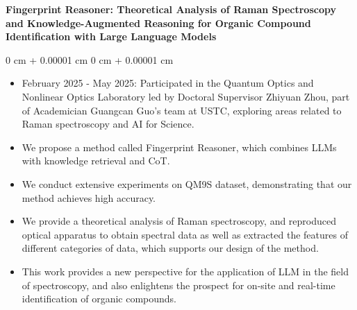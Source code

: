 \documentclass[10pt, letterpaper]{article}
\newenvironment{highlights}{
    \begin{itemize}[
        topsep=0.10 cm,
        parsep=0.10 cm,
        partopsep=0pt,
        itemsep=0pt,
        leftmargin=0 cm + 10pt
    ]
}{
    \end{itemize}
} %
\newenvironment{onecolentry}{
    \begin{adjustwidth}{
        0 cm + 0.00001 cm
    }{
        0 cm + 0.00001 cm
    }
}{
    \end{adjustwidth}
} %
\begin{document}
            \textbf{Fingerprint Reasoner: Theoretical Analysis of Raman Spectroscopy and Knowledge-Augmented Reasoning for Organic Compound Identification with Large Language Models}
        \vspace{0.10 cm}
        \begin{onecolentry}
            \begin{highlights}
                \item February 2025 - May 2025: Participated in the Quantum Optics and Nonlinear Optics Laboratory led by Doctoral Supervisor Zhiyuan Zhou, part of Academician Guangcan Guo's team at USTC, exploring areas related to Raman spectroscopy and AI for Science.
\item We propose a method called Fingerprint Reasoner, which combines
LLMs with knowledge retrieval and CoT.
\item  We conduct extensive experiments on QM9S dataset, demonstrating that
our method achieves high accuracy.
\item We provide a theoretical analysis of Raman spectroscopy, and reproduced
optical apparatus to obtain spectral data as well as extracted the features of
different categories of data, which supports our design of the method.
                \item This work provides a new perspective for the application of LLM in the field of spectroscopy, and also enlightens the prospect for on-site and real-time identification of organic compounds.

            \end{highlights}
        \end{onecolentry}
        
        



\end{document}
